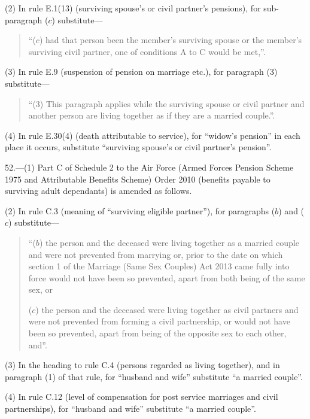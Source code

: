 \documentclass[12pt,a4paper]{article}
\begin{document}
(2) In rule E.1(13) (surviving spouse’s or civil partner’s pensions), for sub-paragraph ($c$)  substitute—
\begin{quotation}
“($c$) had that person been the member’s surviving spouse or the member’s surviving civil partner, one of conditions A to C would be met,”.
\end{quotation}

(3) In rule E.9 (suspension of pension on marriage etc.), for paragraph (3) substitute—
\begin{quotation}
“(3) This paragraph applies while the surviving spouse or civil partner and another person are living together as if they are a married couple.”.
\end{quotation}

(4) In rule E.30(4) (death attributable to service), for “widow’s pension” in each place it occurs, substitute “surviving spouse’s or civil partner’s pension”.

\medskip

52.—(1) Part C of Schedule 2 to the Air Force (Armed Forces Pension Scheme 1975 and Attributable Benefits Scheme) Order 2010 (benefits payable to surviving adult dependants) is amended as follows.

(2) In rule C.3 (meaning of “surviving eligible partner”), for paragraphs ($b$)  and ($c$)  substitute—
\begin{quotation}
“($b$) the person and the deceased were living together as a married couple and were not prevented from marrying or, prior to the date on which section 1 of the Marriage (Same Sex Couples) Act 2013 came fully into force would not have been so prevented, apart from both being of the same sex, or

($c$) the person and the deceased were living together as civil partners and were not prevented from forming a civil partnership, or would not have been so prevented, apart from being of the opposite sex to each other, and”.
\end{quotation}

(3) In the heading to rule C.4 (persons regarded as living together), and in paragraph (1) of that rule, for “husband and wife” substitute “a married couple”.

(4) In rule C.12 (level of compensation for post service marriages and civil partnerships), for “husband and wife” substitute “a married couple”.
\end{document}
